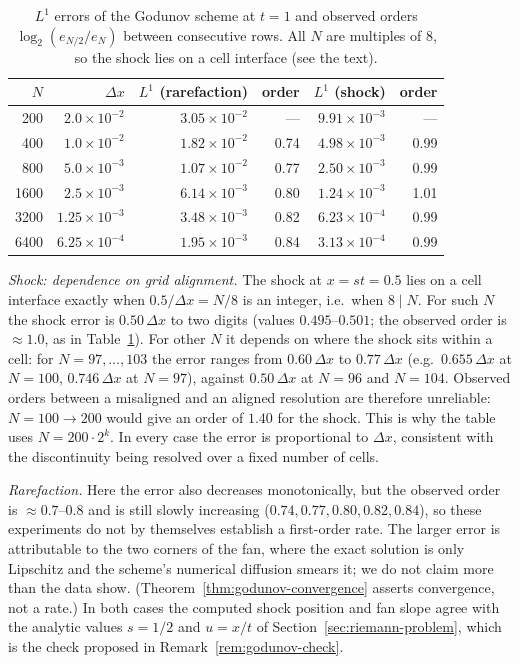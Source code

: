 \begin{table}[h]
\centering
\begin{tabular}{r r r r r r}
  $N$ & $\Delta x$ & $L^1$ (rarefaction) & order & $L^1$ (shock) & order \\\hline
  200  & $2.0\times10^{-2}$ & $3.05\times10^{-2}$ & --- & $9.91\times10^{-3}$ & --- \\
  400  & $1.0\times10^{-2}$ & $1.82\times10^{-2}$ & 0.74 & $4.98\times10^{-3}$ & 0.99 \\
  800  & $5.0\times10^{-3}$ & $1.07\times10^{-2}$ & 0.77 & $2.50\times10^{-3}$ & 0.99 \\
  1600 & $2.5\times10^{-3}$ & $6.14\times10^{-3}$ & 0.80 & $1.24\times10^{-3}$ & 1.01 \\
  3200 & $1.25\times10^{-3}$ & $3.48\times10^{-3}$ & 0.82 & $6.23\times10^{-4}$ & 0.99 \\
  6400 & $6.25\times10^{-4}$ & $1.95\times10^{-3}$ & 0.84 & $3.13\times10^{-4}$ & 0.99
\end{tabular}
\caption{$L^1$ errors of the Godunov scheme at $t=1$ and observed orders
$\log_2(e_{N/2}/e_N)$ between consecutive rows. All $N$ are multiples of
$8$, so the shock lies on a cell interface (see the text).}
\label{tab:godunov-conv}
\end{table}

\emph{Shock: dependence on grid alignment.} The shock at $x=st=0.5$ lies
on a cell interface exactly when $0.5/\Delta x=N/8$ is an integer, i.e.\
when $8\mid N$. For such $N$ the shock error is $0.50\,\Delta x$ to two
digits (values $0.495$--$0.501$; the observed order is $\approx1.0$, as in
Table~\ref{tab:godunov-conv}). For other $N$ it depends on where the shock
sits within a cell: for $N=97,\dots,103$ the error ranges from
$0.60\,\Delta x$ to $0.77\,\Delta x$ (e.g.\ $0.655\,\Delta x$ at $N=100$,
$0.746\,\Delta x$ at $N=97$), against $0.50\,\Delta x$ at $N=96$ and
$N=104$. Observed orders between a misaligned and an aligned resolution are
therefore unreliable: $N=100\to200$ would give an order of $1.40$ for the
shock. This is why the table uses $N=200\cdot2^k$. In every case the error
is proportional to $\Delta x$, consistent with the discontinuity being
resolved over a fixed number of cells.

\emph{Rarefaction.} Here the error also decreases monotonically, but the
observed order is $\approx0.7$--$0.8$ and is still slowly increasing
($0.74,0.77,0.80,0.82,0.84$), so these experiments do not by themselves
establish a first-order rate. The larger error is attributable to the two
corners of the fan, where the exact solution is only Lipschitz and the
scheme's numerical diffusion smears it; we do not claim more than the data
show. (Theorem~\ref{thm:godunov-convergence} asserts convergence, not a
rate.) In both cases the computed shock position and fan slope agree with
the analytic values $s=1/2$ and $u=x/t$ of
Section~\ref{sec:riemann-problem}, which is the check proposed in
Remark~\ref{rem:godunov-check}.

